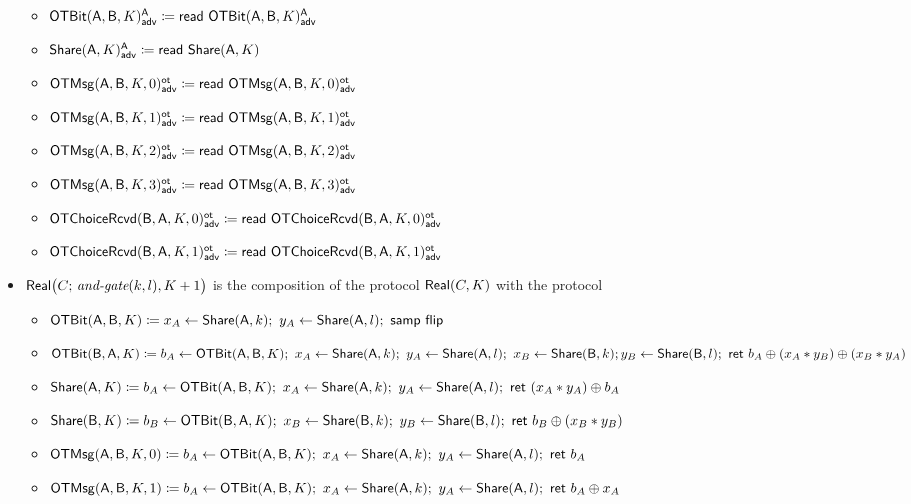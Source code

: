 \begin{itemize}
\begin{itemize}
\item {\color{blue} $\LeakOTBit(\A,\B,K)^\A_\adv \coloneqq \read{\LeakOTBit(\A,\B,K)^\A_\adv}$}
\item {\color{blue} $\LeakShare(\A,K)^\A_\adv \coloneqq \read{\Share(\A,K)}$}\medskip
\item {\color{blue} $\LeakOTMsg(\A,\B,K,0)^\ot_\adv \coloneqq \read{\LeakOTMsg(\A,\B,K,0)^\ot_\adv}$}
\item {\color{blue} $\LeakOTMsg(\A,\B,K,1)^\ot_\adv \coloneqq \read{\LeakOTMsg(\A,\B,K,1)^\ot_\adv}$}
\item {\color{blue} $\LeakOTMsg(\A,\B,K,2)^\ot_\adv \coloneqq \read{\LeakOTMsg(\A,\B,K,2)^\ot_\adv}$}
\item {\color{blue} $\LeakOTMsg(\A,\B,K,3)^\ot_\adv \coloneqq \read{\LeakOTMsg(\A,\B,K,3)^\ot_\adv}$}\medskip
\item {\color{blue} $\LeakOTChoiceRcvd(\B,\A,K,0)^\ot_\adv \coloneqq \read{\LeakOTChoiceRcvd(\B,\A,K,0)^\ot_\adv}$}
\item {\color{blue} $\LeakOTChoiceRcvd(\B,\A,K,1)^\ot_\adv \coloneqq \read{\LeakOTChoiceRcvd(\B,\A,K,1)^\ot_\adv}$}
\end{itemize}
\item $\Real\big(C; \, \andgate(k,l),K+1\big)$ is the composition of the protocol $\Real(C,K)$ with the protocol
\begin{itemize}
\item $\OTBit(\A,\B,K) \coloneqq x_A \leftarrow \Share(\A,k); \ y_A \leftarrow \Share(\A,l); \ \samp{\flip}$
\item $\OTBit(\B,\A,K) \coloneqq b_A \leftarrow \OTBit(\A,\B,K); \ x_A \leftarrow \Share(\A,k); \ y_A \leftarrow \Share(\A,l); \ x_B \leftarrow \Share(\B,k); \\ y_B \leftarrow \Share(\B,l); \ \ret{b_A \oplus (x_A * y_B) \oplus (x_B * y_A)}$\smallskip
\item $\Share(\A,K) \coloneqq b_A \leftarrow \OTBit(\A,\B,K); \ x_A \leftarrow \Share(\A,k); \ y_A \leftarrow \Share(\A,l); \ \ret{(x_A * y_A) \oplus b_A}$
\item $\Share(\B,K) \coloneqq b_B \leftarrow \OTBit(\B,\A,K); \ x_B \leftarrow \Share(\B,k); \ y_B \leftarrow \Share(\B,l); \ \ret{b_B \oplus (x_B * y_B)}$\smallskip
\item $\OTMsg(\A,\B,K,0) \coloneqq b_A \leftarrow \OTBit(\A,\B,K); \ x_A \leftarrow \Share(\A,k); \ y_A \leftarrow \Share(\A,l); \ \ret{b_A}$
\item $\OTMsg(\A,\B,K,1) \coloneqq b_A \leftarrow \OTBit(\A,\B,K); \ x_A \leftarrow \Share(\A,k); \ y_A \leftarrow \Share(\A,l); \ \ret{b_A \oplus x_A}$

\end{itemize}
\end{itemize}
